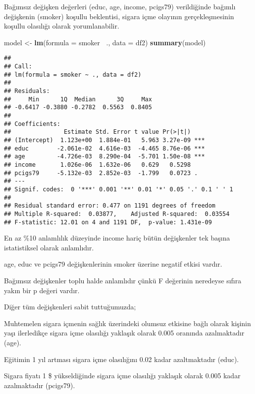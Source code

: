 \documentclass[
]{book}
\newenvironment{Shaded}{\begin{snugshade}}{\end{snugshade}}
\newcommand{\DataTypeTok}[1]{\textcolor[rgb]{0.13,0.29,0.53}{#1}}
\newcommand{\KeywordTok}[1]{\textcolor[rgb]{0.13,0.29,0.53}{\textbf{#1}}}
\newcommand{\NormalTok}[1]{#1}
\newcommand{\OperatorTok}[1]{\textcolor[rgb]{0.81,0.36,0.00}{\textbf{#1}}}
\newcommand{\StringTok}[1]{\textcolor[rgb]{0.31,0.60,0.02}{#1}}
\begin{document}
Bağımsız değişken değerleri (educ, age, income, pcigs79) verildiğinde bağımlı değişkenin (smoker) koşullu beklentisi, sigara içme olayının gerçekleşmesinin koşullu olasılığı olarak yorumlanabilir.

\begin{Shaded}
\begin{Highlighting}[]
\NormalTok{model <-}\StringTok{ }\KeywordTok{lm}\NormalTok{(}\DataTypeTok{formula =}\NormalTok{ smoker }\OperatorTok{~}\NormalTok{., }\DataTypeTok{data =}\NormalTok{ df2)}
\KeywordTok{summary}\NormalTok{(model)}
\end{Highlighting}
\end{Shaded}

\begin{verbatim}
## 
## Call:
## lm(formula = smoker ~ ., data = df2)
## 
## Residuals:
##     Min      1Q  Median      3Q     Max 
## -0.6417 -0.3880 -0.2782  0.5563  0.8405 
## 
## Coefficients:
##               Estimate Std. Error t value Pr(>|t|)    
## (Intercept)  1.123e+00  1.884e-01   5.963 3.27e-09 ***
## educ        -2.061e-02  4.616e-03  -4.465 8.76e-06 ***
## age         -4.726e-03  8.290e-04  -5.701 1.50e-08 ***
## income       1.026e-06  1.632e-06   0.629   0.5298    
## pcigs79     -5.132e-03  2.852e-03  -1.799   0.0723 .  
## ---
## Signif. codes:  0 '***' 0.001 '**' 0.01 '*' 0.05 '.' 0.1 ' ' 1
## 
## Residual standard error: 0.477 on 1191 degrees of freedom
## Multiple R-squared:  0.03877,    Adjusted R-squared:  0.03554 
## F-statistic: 12.01 on 4 and 1191 DF,  p-value: 1.431e-09
\end{verbatim}

En az \%10 anlamlılık düzeyinde income hariç bütün değişkenler tek başına istatistiksel olarak anlamlıdır.

age, educ ve pcigs79 değişkenlerinin smoker üzerine negatif etkisi vardır.

Bağımsız değişkenler toplu halde anlamlıdır çünkü F değerinin neredeyse sıfıra yakın bir p değeri vardır.

Diğer tüm değişkenleri sabit tuttuğumuzda;

Muhtemelen sigara içmenin sağlık üzerindeki olumsuz etkisine bağlı olarak kişinin yaşı ilerledikçe sigara içme olasılığı yaklaşık olarak 0.005 oranında azalmaktadır (age).

Eğitimin 1 yıl artması sigara içme olasılığını 0.02 kadar azaltmaktadır (educ).

Sigara fiyatı 1 \$ yükseldiğinde sigara içme olasılığı yaklaşık olarak 0.005 kadar azalmaktadır (pcigs79).
\end{document}
